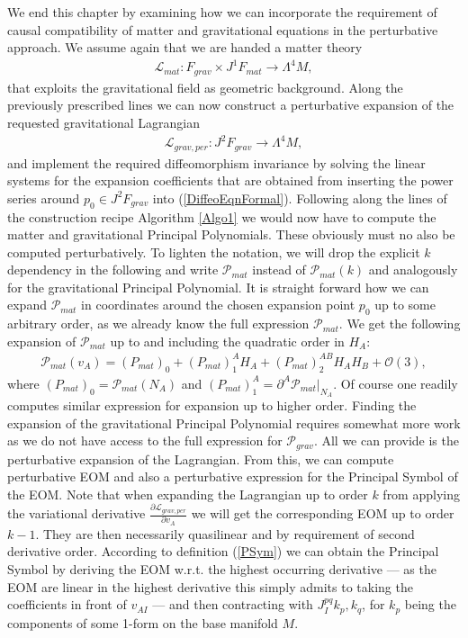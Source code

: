 \documentclass[a4paper,12pt, DIV=14, BCOR=5mm, twoside, headsepline, numbers=noenddot]{scrbook}
\begin{document}
We end this chapter by examining how we can incorporate the requirement of causal compatibility of matter and gravitational equations in the perturbative approach.
We assume again that we are handed a matter theory 
\begin{align}
    \mathcal{L}_{mat} : F_{grav} \times J^1F_{mat} \longrightarrow \Lambda^4M,
\end{align}
that exploits the gravitational field as geometric background. Along the previously prescribed lines we can now construct a perturbative expansion of the requested gravitational Lagrangian
\begin{align}
    \mathcal{L}_{grav,per} : J^2F_{grav} \longrightarrow \Lambda^4M,
\end{align}
and implement the required diffeomorphism invariance by solving the linear systems for the expansion coefficients that are obtained from inserting the power series around $p_0 \in J^2F_{grav}$ into (\ref{DiffeoEqnFormal}). 
Following along the lines of the construction recipe Algorithm \ref{Algo1} we would now have to compute the matter and gravitational Principal Polynomials.
These obviously must no also be computed perturbatively. 
To lighten the notation, we will drop the explicit $k$ dependency in the following and write $\mathcal{P}_{mat}$ instead of $\mathcal{P}_{mat}(k)$ and analogously for the gravitational Principal Polynomial. It is straight forward how we can expand $\mathcal{P}_{mat}$ in coordinates around the chosen expansion point $p_0$ up to some arbitrary order, as we already know the full expression $\mathcal{P}_{mat}$. We get the following expansion of $\mathcal{P}_{mat}$ up to and including the quadratic order in $H_A$:
\begin{align}
    \mathcal{P}_{mat}(v_A) = (P_{mat})_{0} + (P_{mat})^A_1 H_A+ (P_{mat})^{AB}_2 H_A H_B +\mathcal{O}(3),
\end{align}
where $(P_{mat})_0 = \mathcal{P}_{mat}(N_A)$ and $(P_{mat})_1^A = \partial^A \mathcal{P}_{mat} \vert _{N_A}$. Of course one readily computes similar expression for expansion up to higher order. 
Finding the expansion of the gravitational Principal Polynomial requires somewhat more work as we do not have access to the full expression for $\mathcal{P}_{grav}$. All we can provide is the perturbative expansion of the Lagrangian. From this, we can compute perturbative EOM and also a perturbative expression for the Principal Symbol of the EOM.
Note that when expanding the Lagrangian up to order $k$ from applying the variational derivative $\frac{\partial\mathcal L_{grav,per}}{\partial v_A}$ we will get the corresponding EOM up to order $k-1$. They are then necessarily quasilinear and by requirement of second derivative order. According to definition (\ref{PSym}) we can obtain the Principal Symbol by deriving the EOM w.r.t. the highest occurring derivative  --- as the EOM are linear in the highest derivative this simply admits to taking the coefficients in front of $v_{AI}$ --- and then contracting with $J_I^{pq} k_p, k_q$, for $k_p$ being the components of some 1-form on the base manifold $M$. 
\end{document}
